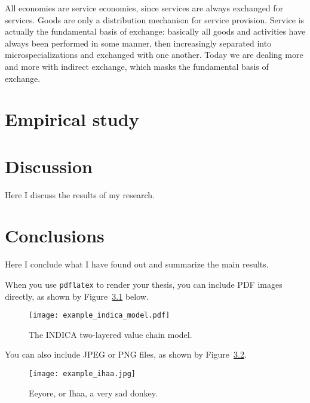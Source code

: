 \documentclass[12pt,a4paper,oneside,pdftex]{report}
\begin{document}
All economies are service economies, since services are always exchanged for services. Goods are only a distribution mechanism for service provision. Service is actually the fundamental basis of exchange: basically all goods and activities have always been performed in some manner, then increasingly separated into microspecializations and exchanged with one another. Today we are dealing more and more with indirect exchange, which masks the fundamental basis of exchange. ~\citep{vargolusch2004}



% 

\chapter{Empirical study}
\label{chapter:environment}




\chapter{Discussion}
\label{chapter:discussion}

Here I discuss the results of my research.

\chapter{Conclusions}
\label{chapter:conclusions}

Here I conclude what I have found out and summarize the main results.


When you use \texttt{pdflatex} to render your thesis, you can include PDF images
directly, as shown by Figure~\ref{fig:indica_model} below.

\begin{figure}[ht]
  \begin{center}
    \texttt{[image: example\_indica\_model.pdf]}
    \caption{The INDICA two-layered value chain model.}
    \label{fig:indica_model}
  \end{center}
\end{figure}

You can also include JPEG or PNG files, as shown by Figure~\ref{fig:eeyore}.

\begin{figure}[ht]
  \begin{center}
    \texttt{[image: example\_ihaa.jpg]}
    \caption{Eeyore, or Ihaa, a very sad donkey.}
    \label{fig:eeyore}
  \end{center}
\end{figure}
\end{document}
